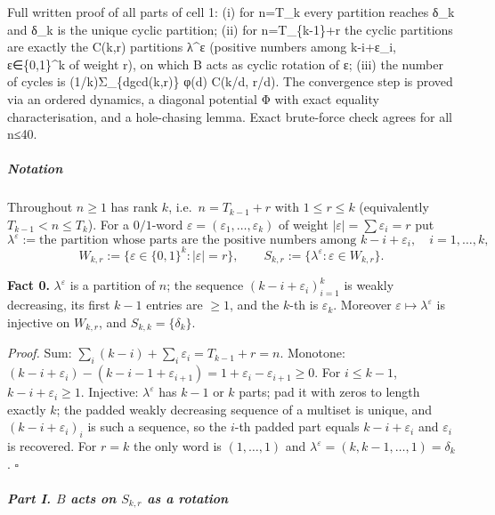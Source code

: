 
Full written proof of all parts of cell 1: (i) for n=T\_k every
partition reaches δ\_k and δ\_k is the unique cyclic partition; (ii) for
n=T\_\{k-1\}+r the cyclic partitions are exactly the C(k,r) partitions
λ\^{}ε (positive numbers among k-i+ε\_i, ε∈\{0,1\}\^{}k of weight r), on
which B acts as cyclic rotation of ε; (iii) the number of cycles is
(1/k)Σ\_\{d\textbar gcd(k,r)\} φ(d) C(k/d, r/d). The convergence step is
proved via an ordered dynamics, a diagonal potential Φ with exact
equality characterisation, and a hole-chasing lemma. Exact brute-force
check agrees for all n≤40.


\subparagraph{Notation}\label{notation}

Throughout \(n\ge 1\) has rank \(k\), i.e.~\(n=T_{k-1}+r\) with
\(1\le r\le k\) (equivalently \(T_{k-1}<n\le T_k\)). For a \(0/1\)-word
\(\varepsilon=(\varepsilon_1,\dots,\varepsilon_k)\) of weight
\(|\varepsilon|=\sum\varepsilon_i=r\) put
\[\lambda^{\varepsilon}:=\text{the partition whose parts are the positive numbers among } k-i+\varepsilon_i,\quad i=1,\dots,k,\]
\[W_{k,r}:=\{\varepsilon\in\{0,1\}^k:|\varepsilon|=r\},\qquad S_{k,r}:=\{\lambda^{\varepsilon}:\varepsilon\in W_{k,r}\}.\]

\textbf{Fact 0.} \(\lambda^\varepsilon\) is a partition of \(n\); the
sequence \((k-i+\varepsilon_i)_{i=1}^k\) is weakly decreasing, its first
\(k-1\) entries are \(\ge1\), and the \(k\)-th is \(\varepsilon_k\).
Moreover \(\varepsilon\mapsto\lambda^\varepsilon\) is injective on
\(W_{k,r}\), and \(S_{k,k}=\{\delta_k\}\).

\emph{Proof.} Sum: \(\sum_i(k-i)+\sum_i\varepsilon_i=T_{k-1}+r=n\).
Monotone:
\((k-i+\varepsilon_i)-(k-i-1+\varepsilon_{i+1})=1+\varepsilon_i-\varepsilon_{i+1}\ge0\).
For \(i\le k-1\), \(k-i+\varepsilon_i\ge1\). Injective:
\(\lambda^\varepsilon\) has \(k-1\) or \(k\) parts; pad it with zeros to
length exactly \(k\); the padded weakly decreasing sequence of a
multiset is unique, and \((k-i+\varepsilon_i)_i\) is such a sequence, so
the \(i\)-th padded part equals \(k-i+\varepsilon_i\) and
\(\varepsilon_i\) is recovered. For \(r=k\) the only word is
\((1,\dots,1)\) and \(\lambda^\varepsilon=(k,k-1,\dots,1)=\delta_k\).
\(\square\)

\subparagraph{\texorpdfstring{Part I. \(B\) acts on \(S_{k,r}\) as a
rotation}{Part I. B acts on S\_\{k,r\} as a rotation}}\label{part-i.-b-acts-on-s_kr-as-a-rotation}

